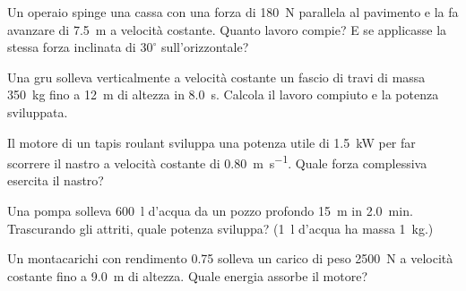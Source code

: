 \begin{esercizio}
Un operaio spinge una cassa con una forza di \SI{180}{\newton} parallela al pavimento e la fa avanzare di \SI{7,5}{\metre} a velocità costante. Quanto lavoro compie? E se applicasse la stessa forza inclinata di $30^\circ$ sull'orizzontale?\\
\end{esercizio}

\begin{esercizio}
Una gru solleva verticalmente a velocità costante un fascio di travi di massa \SI{350}{\kilo\gram} fino a \SI{12}{\metre} di altezza in \SI{8,0}{\second}. Calcola il lavoro compiuto e la potenza sviluppata.\\
\end{esercizio}

\begin{esercizio}
Il motore di un tapis roulant sviluppa una potenza utile di \SI{1,5}{\kilo\watt} per far scorrere il nastro a velocità costante di \SI{0,80}{\metre\per\second}. Quale forza complessiva esercita il nastro?\\
\end{esercizio}

\begin{esercizio}
Una pompa solleva \SI{600}{\litre} d'acqua da un pozzo profondo \SI{15}{\metre} in \SI{2,0}{\minute}. Trascurando gli attriti, quale potenza sviluppa? (\SI{1}{\litre} d'acqua ha massa \SI{1}{\kilo\gram}.)\\
\end{esercizio}

\begin{esercizio}
Un montacarichi con rendimento \num{0,75} solleva un carico di peso \SI{2500}{\newton} a velocità costante fino a \SI{9,0}{\metre} di altezza. Quale energia assorbe il motore?\\
\end{esercizio}

